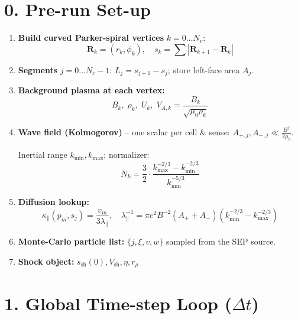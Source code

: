 \section*{0. Pre-run Set-up}

\begin{enumerate}[label=\arabic*.]
\item \textbf{Build curved Parker-spiral vertices} $k = 0 \dots N_v$:
\[
\mathbf{R}_k = (r_k, \phi_k), \quad s_k = \sum |\mathbf{R}_{k+1} - \mathbf{R}_k|
\]
\item \textbf{Segments} $j = 0 \dots N_c - 1$: $L_j = s_{j+1} - s_j$; store left-face area $A_j$.
\item \textbf{Background plasma at each vertex:} 
\[
B_k,\; \rho_k,\; U_k,\; V_{A,k} = \frac{B_k}{\sqrt{\mu_0 \rho_k}}
\]
\item \textbf{Wave field (Kolmogorov)} – one scalar per cell \& sense: $A_{+,j}, A_{-,j} \ll \frac{B^2}{2\mu_0}$.

Inertial range $k_{\min}, k_{\max}$; normalizer:
\[
N_k = \frac{3}{2} \cdot \frac{k_{\max}^{-2/3} - k_{\min}^{-2/3}}{k_{\min}^{-5/3}}
\]

\item \textbf{Diffusion lookup:}
\[
\kappa_\parallel(p_m, s_j) = \frac{v_m}{3\lambda_\parallel}, \quad 
\lambda_\parallel^{-1} = \pi e^2 B^{-2}(A_+ + A_-) (k_{\min}^{-2/3} - k_{\max}^{-2/3})
\]

\item \textbf{Monte-Carlo particle list:} $\{j, \xi, v, w\}$ sampled from the SEP source.

\item \textbf{Shock object:} $s_{\text{sh}}(0), V_{\text{sh}}, \eta, r_\rho$
\end{enumerate}

\section*{1. Global Time-step Loop ($\Delta t$)}


